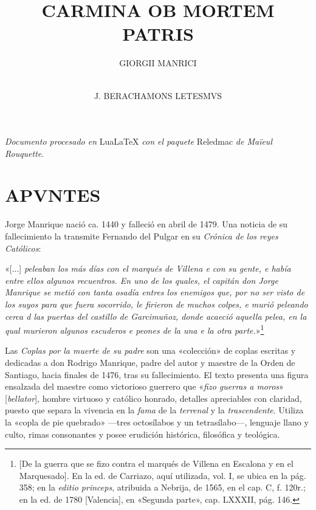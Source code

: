 \documentclass[11pt,a4paper,twoside]{article}
\title{CARMINA OB MORTEM PATRIS}
\author{\fontsize{14}{11.96}\selectfont GIORGII MANRICI}
\date{\vspace{60pt}\fontsize{9}{11}\selectfont{EDITIO CRITICA INSTRVXIT}\\\vspace{15pt}\fontsize{12}{9}\selectfont J. BERACHAMONS LETESMVS\\\fontsize{40}{11}\selectfont{\vfill\LaTeX}}
\newcommand{\comillas}[1]{«#1»}
\begin{document}
	{
	\maketitle
}
	\newpage

\null
\vfill
\begin{flushright}
	\textit{Documento procesado en} LuaLaTeX \textit{con el paquete} Reledmac \textit{de Maïeul Rouquette}.
\end{flushright}
\newpage

\tableofcontents
\newpage

\setcounter{page}{1}
\section*{{\fontsize{13}{14.35}\selectfont APVNTES}}

Jorge Manrique nació ca. 1440 y falleció en abril de 1479. Una noticia de su fallecimiento la transmite Fernando del Pulgar en su \textit{Crónica de los reyes Católicos}:

\comillas{[...] \textit{peleaban los más días con el marqués de Villena e con su gente, e había entre ellos algunos recuentros. En uno de los quales, el capitán don Jorge Manrique se metió con tanta osadía entres los enemigos que, por no ser visto de los suyos para que fuera socorrido, le firieron de muchos colpes, e murió peleando cerca d las puertas del castillo de Garcimuñoz, donde acaeció aquella pelea, en la qual murieron algunos escuderos e peones de la una e la otra parte.}}\footnote{ [De la guerra que se fizo contra el marqués de Villena en Escalona y en el Marquesado]. En la ed. de Carriazo, aquí utilizada, vol. I, se ubica en la pág. 358; en la \textit{editio princeps}, atribuida a Nebrija, de 1565, en el cap. C, f. 120r.; en la ed. de 1780 [Valencia], en \comillas{Segunda parte}, cap. LXXXII, pág. 146.} \vspace{5pt}

Las \textit{Coplas por la muerte de su padre} son una «colección» de coplas escritas y dedicadas a don Rodrigo Manrique, padre del autor y maestre de la Orden de Santiago, hacia finales de 1476, tras su fallecimiento. El texto presenta una figura ensalzada del maestre como victorioso guerrero que \comillas{\textit{fizo guerras a moros}} [\textit{bellator}], hombre virtuoso y católico honrado, detalles apreciables con claridad, puesto que separa la vivencia en la \textit{fama} de la \textit{terrenal} y la \textit{trascendente}. Utiliza la \comillas{copla de pie quebrado} —tres octosílabos y un tetrasílabo—, lenguaje llano y culto, rimas consonantes y posee erudición histórica, filosófica y teológica.
\end{document}
